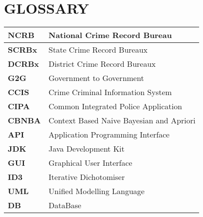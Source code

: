 \chapter{GLOSSARY}
\begin{table}[ht]
\centering
\begin{tabular}{ |M{3cm}|p{8cm}|  }
 \hline
\textbf{NCRB}& National Crime Record Bureau \\
\hline
\textbf{SCRBx} &State Crime Record Bureaux\\
\hline
\textbf{DCRBx}&  District Crime Record Bureaux\\
\hline
\textbf{G2G} & Government to Government\\
\hline
\textbf{CCIS} & Crime Criminal Information System\\
\hline
\textbf{CIPA} & Common Integrated Police Application\\
\hline
\textbf{CBNBA} & Context Based Naive Bayesian and Apriori \\
\hline
\textbf{API} & Application Programming Interface\\
\hline
\textbf{JDK} & Java Development Kit\\
\hline
\textbf{GUI} & Graphical User Interface\\
\hline
\textbf{ID3} & Iterative Dichotomiser\\
\hline
\textbf{UML} & Unified Modelling Language\\
\hline
\textbf{DB}&  DataBase\\
\hline


\end{tabular}

\end{table}

